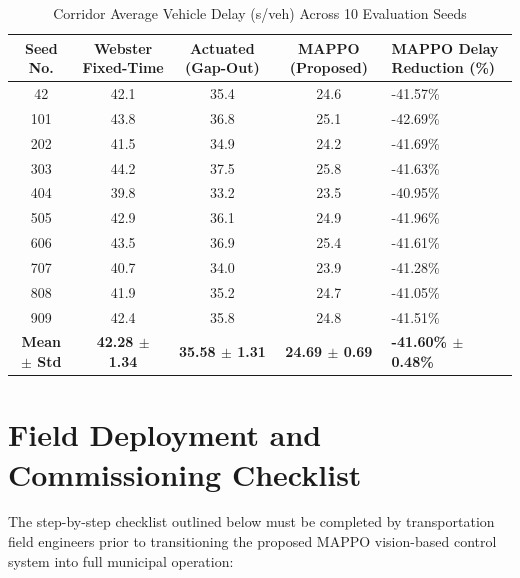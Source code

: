 \documentclass[12pt,a4paper,oneside]{report}
\begin{document}
\begin{table}[htbp]
\centering
\small
\caption{Corridor Average Vehicle Delay (s/veh) Across 10 Evaluation Seeds}
\label{tab:seed_benchmark}
\begin{tabularx}{\textwidth}{|c|c|c|c|X|}
\hline
\textbf{Seed No.} & \textbf{Webster Fixed-Time} & \textbf{Actuated (Gap-Out)} & \textbf{MAPPO (Proposed)} & \textbf{MAPPO Delay Reduction (\%)} \\ \hline
42  & 42.1 & 35.4 & 24.6 & -41.57\% \\ \hline
101 & 43.8 & 36.8 & 25.1 & -42.69\% \\ \hline
202 & 41.5 & 34.9 & 24.2 & -41.69\% \\ \hline
303 & 44.2 & 37.5 & 25.8 & -41.63\% \\ \hline
404 & 39.8 & 33.2 & 23.5 & -40.95\% \\ \hline
505 & 42.9 & 36.1 & 24.9 & -41.96\% \\ \hline
606 & 43.5 & 36.9 & 25.4 & -41.61\% \\ \hline
707 & 40.7 & 34.0 & 23.9 & -41.28\% \\ \hline
808 & 41.9 & 35.2 & 24.7 & -41.05\% \\ \hline
909 & 42.4 & 35.8 & 24.8 & -41.51\% \\ \hline
\textbf{Mean $\pm$ Std} & \textbf{42.28 $\pm$ 1.34} & \textbf{35.58 $\pm$ 1.31} & \textbf{24.69 $\pm$ 0.69} & \textbf{-41.60\% $\pm$ 0.48\%} \\ \hline
\end{tabularx}
\end{table}

\chapter{Field Deployment and Commissioning Checklist}
\label{app:checklist}

The step-by-step checklist outlined below must be completed by transportation field engineers prior to transitioning the proposed MAPPO vision-based control system into full municipal operation:
\end{document}
